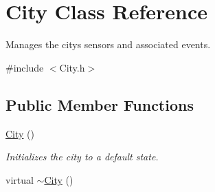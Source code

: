 \hypertarget{class_city}{}\section{City Class Reference}
\label{class_city}


Manages the city\textquotesingle{}s sensors and associated events.  




{\ttfamily \#include $<$City.\+h$>$}

\subsection*{Public Member Functions}
\begin{DoxyCompactItemize}
\item 
\hyperlink{class_city_a1b1f549430f0a7ecd0ec7b1605415193}{City} ()
\begin{DoxyCompactList}\small\item\em Initializes the city to a default state. \end{DoxyCompactList}\item 
\hypertarget{class_city_ae95feee8a1d4e1f14ea41ec89b47304f}{}virtual \hyperlink{class_city_ae95feee8a1d4e1f14ea41ec89b47304f}{$\sim$\+City} ()\label{class_city_ae95feee8a1d4e1f14ea41ec89b47304f}


\end{DoxyCompactItemize}
